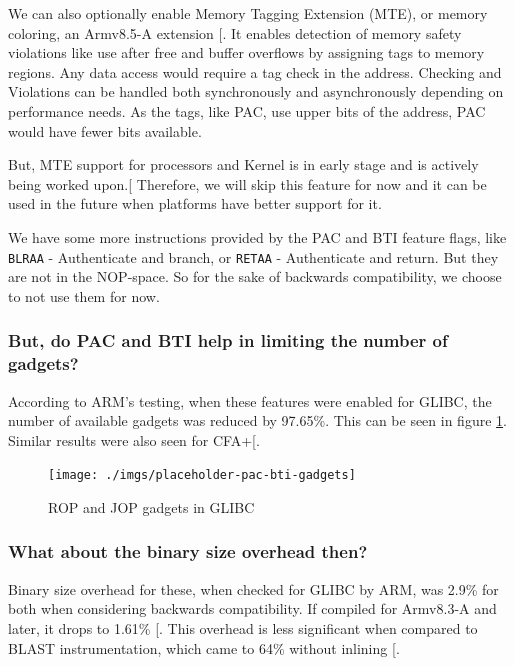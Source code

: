 \documentclass[a4paper, nobind]{templates/ociamthesis}
\begin{document}
We can also optionally enable Memory Tagging Extension (MTE), or memory coloring,
an Armv8.5-A extension {[}\citeproc{ref-arm-pacbti}{5}{]}. It enables detection of memory safety violations like use after free
and buffer overflows by assigning tags to memory regions. Any data access would
require a tag check in the address. Checking and Violations can be handled both
synchronously and asynchronously depending on performance needs.
As the tags, like PAC, use upper bits of the address, PAC would have fewer bits available.

But, MTE support for processors and Kernel is in early stage and is actively being worked upon.{[}\citeproc{ref-mte-kern-patch}{27}{]}
Therefore, we will skip this feature for now and it can be used in the future when platforms
have better support for it.

We have some more instructions provided by the PAC and BTI feature flags,
like \texttt{BLRAA} - Authenticate and branch, or \texttt{RETAA} - Authenticate and return.
But they are not in the NOP-space. So for the sake of backwards compatibility,
we choose to not use them for now.

\subsubsection{But, do PAC and BTI help in limiting the number of gadgets?}\label{but-do-pac-and-bti-help-in-limiting-the-number-of-gadgets}

According to ARM's testing, when these features were enabled for GLIBC, the number
of available gadgets was reduced by 97.65\%. This can be seen in figure \ref{fig:pac-bti-gadgets}.
Similar results were also seen for CFA+{[}\citeproc{ref-cfaplus}{1}{]}.

\begin{figure}

{\centering \texttt{[image: ./imgs/placeholder-pac-bti-gadgets]} 

}

\caption{ROP and JOP gadgets in GLIBC}\label{fig:pac-bti-gadgets}
\end{figure}

\subsubsection{What about the binary size overhead then?}\label{what-about-the-binary-size-overhead-then}

Binary size overhead for these, when checked for GLIBC by ARM, was 2.9\% for both
when considering backwards compatibility. If compiled for Armv8.3-A and later,
it drops to 1.61\% {[}\citeproc{ref-arm-pacbti}{5}{]}.
This overhead is less significant when compared to BLAST instrumentation, which
came to 64\% without inlining {[}\citeproc{ref-blast}{26}{]}.
\end{document}
